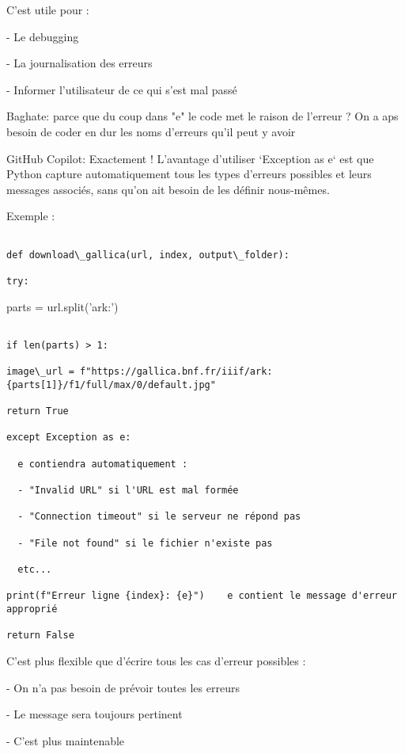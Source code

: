 C'est utile pour :

- Le debugging

- La journalisation des erreurs

- Informer l'utilisateur de ce qui s'est mal passé

Baghate: parce que du coup dans "e" le code met le raison de l'erreur ? On a aps besoin de coder en dur les noms d'erreurs qu'il peut y avoir

GitHub Copilot: Exactement ! L'avantage d'utiliser `Exception as e` est que Python capture automatiquement tous les types d'erreurs possibles et leurs messages associés, sans qu'on ait besoin de les définir nous-mêmes.

Exemple :

\begin{verbatim}

def download\_gallica(url, index, output\_folder):

try:

\end{verbatim}

parts = url.split('ark:')

\begin{verbatim}

if len(parts) > 1:

image\_url = f"https://gallica.bnf.fr/iiif/ark:{parts[1]}/f1/full/max/0/default.jpg"

return True

except Exception as e:

  e contiendra automatiquement :

  - "Invalid URL" si l'URL est mal formée

  - "Connection timeout" si le serveur ne répond pas

  - "File not found" si le fichier n'existe pas

  etc...

print(f"Erreur ligne {index}: {e}")    e contient le message d'erreur approprié

return False

\end{verbatim}

C'est plus flexible que d'écrire tous les cas d'erreur possibles :

- On n'a pas besoin de prévoir toutes les erreurs

- Le message sera toujours pertinent

- C'est plus maintenable

